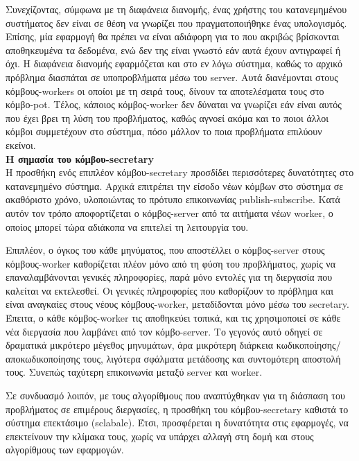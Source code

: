 Συνεχίζοντας, σύμφωνα με τη διαφάνεια διανομής, ένας χρήστης του κατανεμημένου συστήματος δεν είναι σε θέση να γνωρίζει που πραγματοποιήθηκε ένας υπολογισμός. Επίσης, μία εφαρμογή θα πρέπει να είναι αδιάφορη για το που ακριβώς βρίσκονται αποθηκευμένα τα δεδομένα, ενώ δεν της είναι γνωστό εάν αυτά έχουν αντιγραφεί ή όχι. Η διαφάνεια διανομής εφαρμόζεται και στο εν λόγω σύστημα, καθώς το αρχικό πρόβλημα διασπάται σε υποπροβλήματα μέσω του server. Αυτά διανέμονται στους κόμβους-workers οι οποίοι με τη σειρά τους, δίνουν τα αποτελέσματα τους στο κόμβο-pot. Τέλος, κάποιος κόμβος-worker δεν δύναται να γνωρίζει εάν είναι αυτός που έχει βρει τη λύση του προβλήματος, καθώς αγνοεί ακόμα και το ποιοι άλλοι κόμβοι συμμετέχουν στο σύστημα, πόσο μάλλον το ποια προβλήματα επιλύουν εκείνοι.  \\


\textbf{Η σημασία του κόμβου-secretary} \\

Η προσθήκη ενός επιπλέον κόμβου-secretary προσδίδει περισσότερες δυνατότητες στο κατανεμημένο σύστημα. Αρχικά επιτρέπει την είσοδο νέων κόμβων στο σύστημα σε ακαθόριστο χρόνο, υλοποιώντας το πρότυπο επικοινωνίας publish-subscribe. Κατά αυτόν τον τρόπο αποφορτίζεται ο κόμβος-server από τα αιτήματα νέων worker, ο οποίος μπορεί τώρα αδιάκοπα να επιτελεί τη λειτουργία του. 

Επιπλέον, ο όγκος του κάθε μηνύματος, που αποστέλλει ο κόμβος-server στους κόμβους-worker καθορίζεται πλέον μόνο από τη φύση του προβλήματος, χωρίς να επαναλαμβάνονται γενικές πληροφορίες, παρά μόνο εντολές για τη διεργασία που καλείται να εκτελεσθεί. Οι γενικές πληροφορίες που καθορίζουν το πρόβλημα και είναι αναγκαίες στους νέους κόμβους-worker, μεταδίδονται μόνο μέσω του secretary. Έπειτα, ο κάθε κόμβος-worker τις αποθηκεύει τοπικά, και τις χρησιμοποιεί σε κάθε νέα διεργασία που λαμβάνει από τον κόμβο-server. Το γεγονός αυτό οδηγεί σε δραματικά μικρότερο μέγεθος μηνυμάτων, άρα μικρότερη διάρκεια κωδικοποίησης/αποκωδικοποίησης τους, λιγότερα σφάλματα μετάδοσης και συντομότερη αποστολή τους. Συνεπώς ταχύτερη επικοινωνία μεταξύ server και worker. 

Σε συνδυασμό λοιπόν, με τους αλγορίθμους που αναπτύχθηκαν για τη διάσπαση του προβλήματος σε επιμέρους διεργασίες, η προσθήκη του κόμβου-secretary καθιστά το σύστημα επεκτάσιμο (sclabale). Έτσι, προσφέρεται η δυνατότητα στις εφαρμογές, να επεκτείνουν την κλίμακα τους, χωρίς να υπάρχει αλλαγή στη δομή και στους αλγορίθμους των εφαρμογών.  


